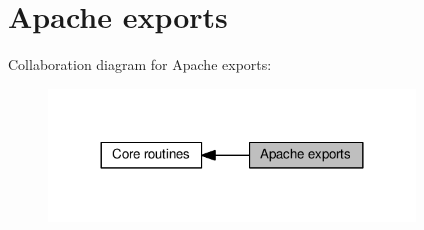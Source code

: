 \hypertarget{group__exports}{}\section{Apache exports}
\label{group__exports}
Collaboration diagram for Apache exports\+:
\nopagebreak
\begin{figure}[H]
\begin{center}
\leavevmode
\includegraphics[width=276pt]{group__exports}
\end{center}
\end{figure}

